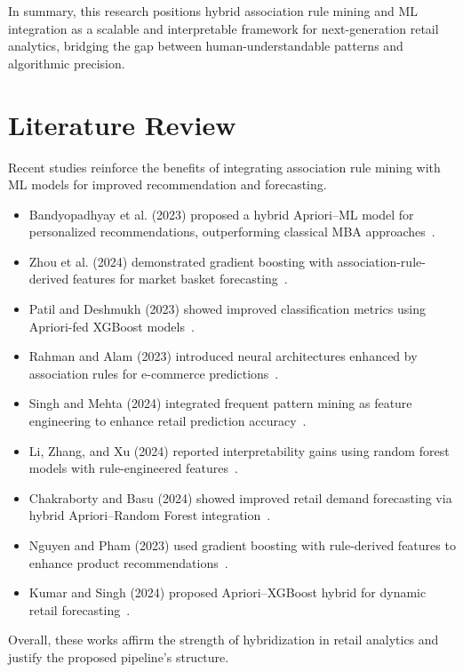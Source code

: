 \documentclass[twocolumn]{article}
\begin{document}
In summary, this research positions hybrid association rule mining and ML integration as a scalable and interpretable framework for next-generation retail analytics, bridging the gap between human-understandable patterns and algorithmic precision.


\section{Literature Review}

Recent studies reinforce the benefits of integrating association rule mining with ML models for improved recommendation and forecasting.

\begin{itemize}
\item Bandyopadhyay et al. (2023) proposed a hybrid Apriori–ML model for personalized recommendations, outperforming classical MBA approaches~\cite{ref1}.
\item Zhou et al. (2024) demonstrated gradient boosting with association-rule-derived features for market basket forecasting~\cite{ref2}.
\item Patil and Deshmukh (2023) showed improved classification metrics using Apriori-fed XGBoost models~\cite{ref3}.
\item Rahman and Alam (2023) introduced neural architectures enhanced by association rules for e-commerce predictions~\cite{ref4}.
\item Singh and Mehta (2024) integrated frequent pattern mining as feature engineering to enhance retail prediction accuracy~\cite{ref5}.
\item Li, Zhang, and Xu (2024) reported interpretability gains using random forest models with rule-engineered features~\cite{ref6}.
\item Chakraborty and Basu (2024) showed improved retail demand forecasting via hybrid Apriori–Random Forest integration~\cite{ref8}.
\item Nguyen and Pham (2023) used gradient boosting with rule-derived features to enhance product recommendations~\cite{ref9}.
\item Kumar and Singh (2024) proposed Apriori–XGBoost hybrid for dynamic retail forecasting~\cite{ref11}.
\end{itemize}

Overall, these works affirm the strength of hybridization in retail analytics and justify the proposed pipeline’s structure.
\end{document}
